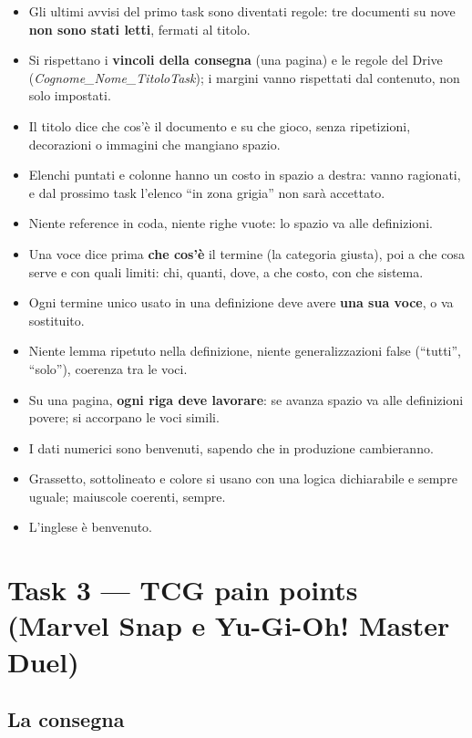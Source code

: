 \begin{itemize}
  \item Gli ultimi avvisi del primo task sono diventati regole: tre documenti
        su nove \textbf{non sono stati letti}, fermati al titolo.
  \item Si rispettano i \textbf{vincoli della consegna} (una pagina) e le
        regole del Drive (\emph{Cognome\_\allowbreak Nome\_\allowbreak TitoloTask}); i margini vanno
        rispettati dal contenuto, non solo impostati.
  \item Il titolo dice che cos'è il documento e su che gioco, senza
        ripetizioni, decorazioni o immagini che mangiano spazio.
  \item Elenchi puntati e colonne hanno un costo in spazio a destra: vanno
        ragionati, e dal prossimo task l'elenco ``in zona grigia'' non sarà
        accettato.
  \item Niente reference in coda, niente righe vuote: lo spazio va alle
        definizioni.
  \item Una voce dice prima \textbf{che cos'è} il termine (la categoria
        giusta), poi a che cosa serve e con quali limiti: chi, quanti, dove,
        a che costo, con che sistema.
  \item Ogni termine unico usato in una definizione deve avere \textbf{una
        sua voce}, o va sostituito.
  \item Niente lemma ripetuto nella definizione, niente generalizzazioni
        false (``tutti'', ``solo''), coerenza tra le voci.
  \item Su una pagina, \textbf{ogni riga deve lavorare}: se avanza spazio va
        alle definizioni povere; si accorpano le voci simili.
  \item I dati numerici sono benvenuti, sapendo che in produzione
        cambieranno.
  \item Grassetto, sottolineato e colore si usano con una logica dichiarabile
        e sempre uguale; maiuscole coerenti, sempre.
  \item L'inglese è benvenuto.
\end{itemize}

\section{Task 3 --- TCG pain points (Marvel Snap e Yu-Gi-Oh! Master Duel)}
\label{rv:t3:sec:task}

\subsection{La consegna}

